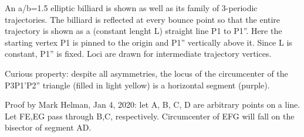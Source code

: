 An a/b=1.5 elliptic billiard is shown as well as its family of 3-periodic trajectories. The billiard is reflected at every bounce point so that the entire trajectory is shown as a (constant lenght L) straight line P1 to P1''. Here the starting vertex P1 is pinned to the origin and P1'' vertically above it. Since L is constant, P1'' is fixed. Loci are drawn for intermediate trajectory vertices.

Curious property: despite all asymmetries, the locus of the circumcenter of the P3P1'P2'' triangle (filled in light yellow) is a horizontal segment (purple).

Proof by Mark Helman, Jan 4, 2020: let A, B, C, D are arbitrary points on a line. Let FE,EG pass through B,C, respectively. Circumcenter of EFG will fall on the bisector of segment AD.